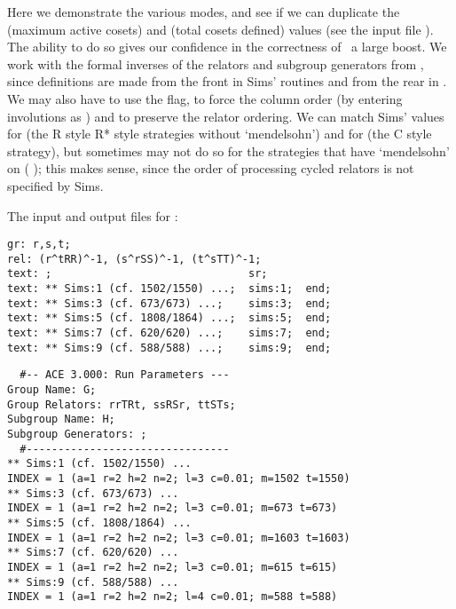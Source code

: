 


Here we demonstrate the various  modes, and see if we can
  duplicate the  (maximum active cosets) and  (total cosets
  defined) values (see the input file ).
The ability to do so gives our confidence in the correctness of \ace\ a
  large boost.
We work with the formal inverses of the relators and subgroup generators
  from \cite{Sim94}, since definitions are made from the front in Sims'
  routines and from the rear in \ace.
We may also have to use the  flag, to force the column order (by
  entering involutions as ) and to preserve the relator ordering.
We can match Sims' values for  \amp {} (the R style 
  \amp R* style strategies without `mendelsohn') and for  
  (the C style strategy), but sometimes may not do so for the strategies
  that have `mendelsohn' on ( \amp {}); this makes sense,
  since the order of processing cycled relators is not specified by Sims.

The input and output files for \cite[Example 5.2]{Sim94}:

\bv\begin{verbatim}
gr: r,s,t;
rel: (r^tRR)^-1, (s^rSS)^-1, (t^sTT)^-1;
text: ;                               sr;
text: ** Sims:1 (cf. 1502/1550) ...;  sims:1;  end;
text: ** Sims:3 (cf. 673/673) ...;    sims:3;  end;
text: ** Sims:5 (cf. 1808/1864) ...;  sims:5;  end;
text: ** Sims:7 (cf. 620/620) ...;    sims:7;  end;
text: ** Sims:9 (cf. 588/588) ...;    sims:9;  end;
\end{verbatim}\ev

\bv\begin{verbatim}
  #-- ACE 3.000: Run Parameters ---
Group Name: G;
Group Relators: rrTRt, ssRSr, ttSTs;
Subgroup Name: H;
Subgroup Generators: ;
  #--------------------------------
** Sims:1 (cf. 1502/1550) ...
INDEX = 1 (a=1 r=2 h=2 n=2; l=3 c=0.01; m=1502 t=1550)
** Sims:3 (cf. 673/673) ...
INDEX = 1 (a=1 r=2 h=2 n=2; l=3 c=0.01; m=673 t=673)
** Sims:5 (cf. 1808/1864) ...
INDEX = 1 (a=1 r=2 h=2 n=2; l=3 c=0.01; m=1603 t=1603)
** Sims:7 (cf. 620/620) ...
INDEX = 1 (a=1 r=2 h=2 n=2; l=3 c=0.01; m=615 t=615)
** Sims:9 (cf. 588/588) ...
INDEX = 1 (a=1 r=2 h=2 n=2; l=4 c=0.01; m=588 t=588)
\end{verbatim}\ev

